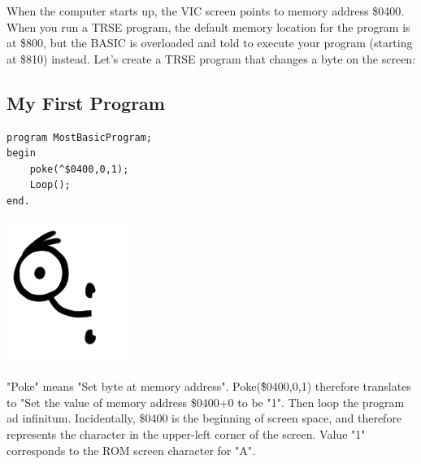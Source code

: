 When the computer starts up, the VIC screen points to memory address \$0400. When you run a TRSE program, the default memory location for the program is at \$800, but the BASIC is overloaded and told to execute your program (starting at \$810) instead. Let's create a TRSE program that changes a byte on the screen:
\subsection{My First Program}
\begin{lstlisting}
program MostBasicProgram;
begin
	poke(^$0400,0,1);
	Loop();
end.
\end{lstlisting}

\begin{minipage}{0.2\textwidth}
\includegraphics[width=\linewidth]{images/trip/trip12.png}
\end{minipage}
\begin{minipage}{0.8\textwidth}
"Poke" means "Set byte at memory address". Poke(\^\$0400,0,1) therefore translates to "Set the value of memory address \$0400+0 to be "1". Then loop the program ad infinitum. Incidentally, \$0400 is the beginning of screen space, and therefore represents the character in the upper-left corner of the screen. Value "1" corresponds to the ROM screen character for "A".
\end{minipage}


